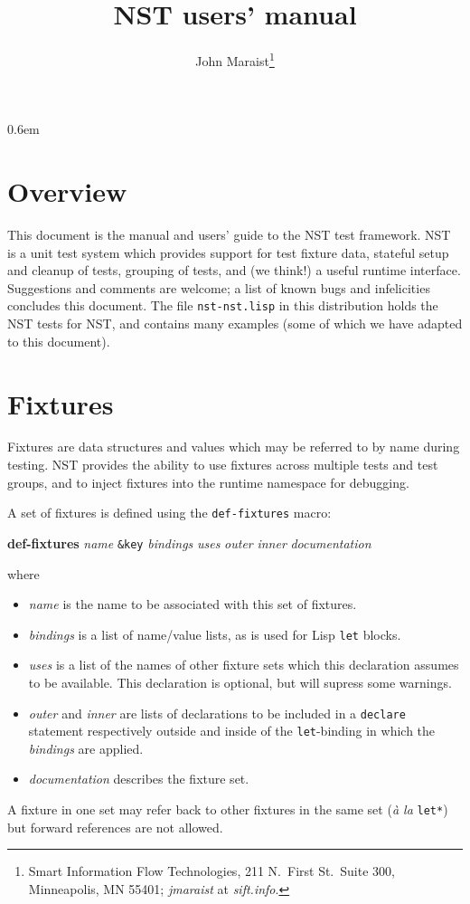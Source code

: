 \documentclass{article}
\title{NST users' manual}
\author{John Maraist\thanks{Smart Information Flow Technologies, 211 N.\ First St.\ Suite 300, Minneapolis, MN 55401; \textsl{jmaraist} at \textsl{sift.info}.}}
\begin{document}
\maketitle
\thispagestyle{empty}
\tableofcontents
\parskip 0.6em
\parindent 0pt

\section*{Overview}
This document is the manual and users' guide to the NST test
framework.  NST is a unit test system which provides support for test
fixture data, stateful setup and cleanup of tests, grouping of tests,
and (we think!) a useful runtime interface.  Suggestions and comments
are welcome; a list of known bugs and infelicities concludes this
document.  The file \texttt{nst-nst.lisp} in this distribution holds
the NST tests for NST, and contains many examples (some of which we
have adapted to this document).

\section{Fixtures}
\label{fixtures}
Fixtures are data structures and values which may be
referred to by name during testing.  NST provides the ability to use
fixtures across multiple tests and test groups, and to inject fixtures
into the runtime namespace for debugging.

A set of fixtures is defined using the \texttt{def-fixtures}
macro:
\begin{center}
\textbf{def-fixtures} \textit{name} \texttt{\&key}
\textit{bindings} \textit{uses} \textit{outer}
\textit{inner} \textit{documentation}
\end{center}
where
\begin{itemize}
\item \textit{name} is the name to be associated with this set of
  fixtures.
\item \textit{bindings} is a list of name/value lists, as is used for
  Lisp \texttt{let} blocks.
\item \textit{uses} is a list of the names of other fixture sets which
  this declaration assumes to be available.  This declaration is
  optional, but will supress some warnings.
\item \textit{outer} and \textit{inner} are lists of declarations to
  be included in a \texttt{declare} statement respectively outside and
  inside of the \texttt{let}-binding in which the \textit{bindings}
  are applied.
\item \textit{documentation} describes the fixture set.
\end{itemize}
A fixture in one set may refer back to other fixtures in the same set
(\emph{\`a la} \texttt{let*}) but forward references are not allowed.
\end{document}

